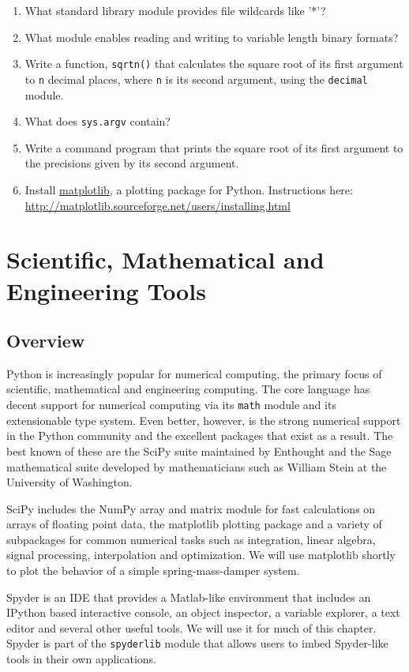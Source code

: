 \documentclass{report}
\begin{document}
\begin{enumerate}
	\item What standard library module provides file wildcards like '*'?
	\item What module enables reading and writing to variable length binary formats?
	\item Write a function, \verb|sqrtn()| that calculates the square root of its first argument to \verb|n| decimal places, where \verb|n| is its second argument, using the \verb|decimal| module.
	\item What does \verb|sys.argv| contain?
	\item Write a command program that prints the square root of its first argument to the precisions given by its second argument.
	\item Install \href{http://matplotlib.sourceforge.net/}{matplotlib}, a plotting package for Python. Instructions here: \url{http://matplotlib.sourceforge.net/users/installing.html}

\end{enumerate}

\chapter{Scientific, Mathematical and Engineering Tools}
\section{Overview}
Python is increasingly popular for numerical computing, the primary focus of scientific, mathematical and engineering computing. The core language has decent support for numerical computing via its \verb|math| module and its extensionable type system. Even better, however, is the strong numerical support in the Python community and the excellent packages that exist as a result. The best known of these are the SciPy suite maintained by Enthought and the Sage mathematical suite developed by mathematicians such as William Stein at the University of Washington.

SciPy\cite{website:scipy} includes the NumPy array and matrix module for fast calculations on arrays of floating point data, the matplotlib plotting package and a variety of subpackages for common numerical tasks such as integration, linear algebra, signal processing, interpolation and optimization. We will use matplotlib\cite{website:matplotlib} shortly to plot the behavior of a simple spring-mass-damper system.

Spyder is an IDE that provides a Matlab-like environment that includes an IPython based interactive console, an object inspector, a variable explorer, a text editor and several other useful tools. We will use it for much of this chapter. Spyder is part of the \verb|spyderlib| module that allows users to imbed Spyder-like tools in their own applications.
\end{document}

